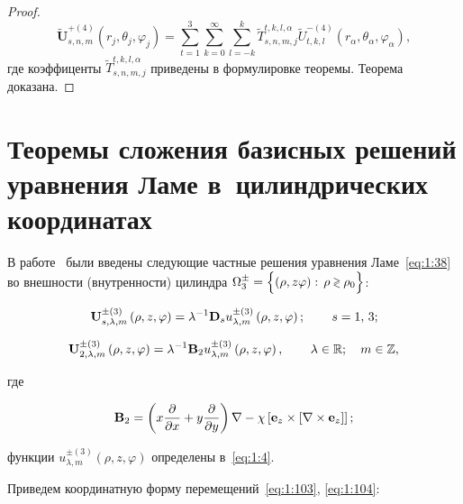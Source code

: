\begin{proof}
\begin{equation}
\mathbf{\tilde U}_{s,n,m}^{+(4)}(r_j,\theta_j,\varphi_j)=\sum\limits_{t=1}^3\sum\limits_{k=0}^\infty\sum\limits_{l=-k}^k\tilde T_{s,n,m,j}^{t,k,l,\alpha}\tilde U_{t,k,l}^{-(4)}(r_\alpha,\theta_\alpha,\varphi_\alpha),
\label{eq:1:122r}
\end{equation}
где коэффиценты $\tilde T_{s,n,m,j}^{t,k,l,\alpha}$ приведены в формулировке теоремы. Теорема доказана.
\end{proof}


\section{Теоремы сложения базисных решений уравнения Ламе в~цилиндрических координатах}

В работе~\cite{Nikolaev1993} были введены следующие частные решения уравнения Ламе~\eqref{eq:1:38} во внешности (внутренности) цилиндра $\Omega _3^ \pm  = \Big\{ {\left( {\rho ,z\varphi } \right):{\mkern 1mu} {\kern 1pt} \rho  \mathbin{\lower.3ex\hbox{$\buildrel>\over
{\smash{\scriptstyle<}\vphantom{_x}}$}} {\rho _0}} \Big\}$:

\begin{equation}\label{eq:1:103}
{\bf{U}}_{s,\lambda ,m}^{ \pm (3)}\left( {\rho ,z,\varphi } \right) = {\lambda ^{ - 1}}{{\bf{D}}_s}u_{\lambda ,m}^{ \pm (3)}\left( {\rho ,z,\varphi } \right);\qquad {\kern 1pt} s = 1,{\mkern 1mu} {\kern 1pt} 3;
\end{equation}

\begin{equation}\label{eq:1:104}
{\bf{U}}_{2,\lambda ,m}^{ \pm (3)}\left( {\rho ,z,\varphi } \right) = {\lambda ^{ - 1}}{{\bf{B}}_2}u_{\lambda ,m}^{ \pm (3)}\left( {\rho ,z,\varphi } \right),\qquad {\kern 1pt} \lambda  \in\mathbb{R};\quad m \in\mathbb{Z},
\end{equation}

\noindent где

\begin{equation}\label{eq:1:105}
{{\bf{B}}_2} = \left( {x\frac{\partial }{{\partial x}} + y\frac{\partial }{{\partial y}}} \right)\nabla  - \chi \left[ {{{\bf{e}}_z} \times \left[ {\nabla  \times {{\bf{e}}_z}} \right]} \right];
\end{equation}

\noindent функции $u_{\lambda ,m}^{ \pm (3)}\left( {\rho ,z,\varphi } \right)$ определены в~\eqref{eq:1:4}.

Приведем координатную форму перемещений~\eqref{eq:1:103}, \eqref{eq:1:104}:

